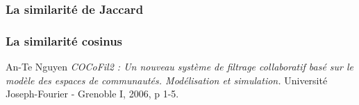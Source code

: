 \documentclass[a4paper, 11pt]{book}
\begin{document}
\subsubsection{La similarité de Jaccard}

\subsubsection{La similarité cosinus }




  \begin{thebibliography}{1}

   An-Te Nguyen {\em COCoFil2 : Un nouveau système de filtrage collaboratif basé sur le modèle des espaces de communautés. Modélisation et simulation. } Université Joseph-Fourier - Grenoble I, 2006, p 1-5.

  \end{thebibliography}
\end{document}
